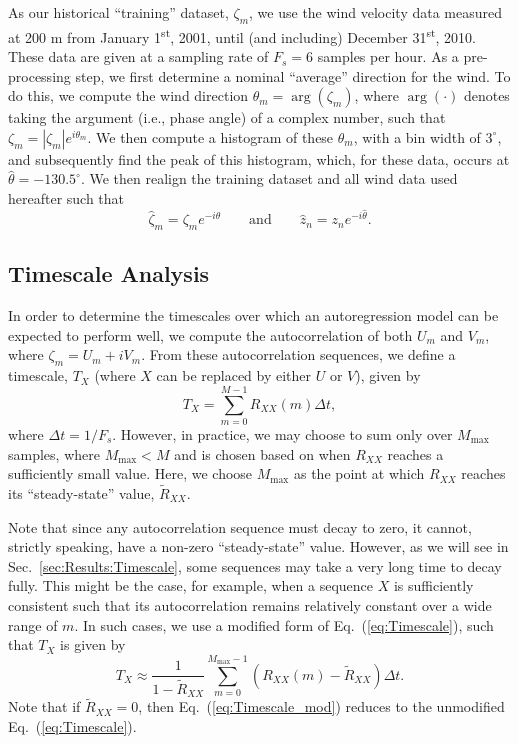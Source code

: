 \documentclass[11pt, oneside]{article}
\newcommand{\eqnref}[1]{Eq.~(\ref{#1})}
\newcommand{\secref}[1]{Sec.~\ref{#1}}
\begin{document}
As our historical ``training'' dataset, $\zeta_m$, we use the wind velocity data measured at 200 m from January 1\textsuperscript{st}, 2001, until (and including) December 31\textsuperscript{st}, 2010.
These data are given at a sampling rate of $F_s = 6$ samples per hour.
As a pre-processing step, we first determine a nominal ``average'' direction for the wind.
To do this, we compute the wind direction $\theta_m = \arg (\zeta_m)$, where $\arg ( \cdot )$ denotes taking the argument (i.e., phase angle) of a complex number, such that $\zeta_m = |\zeta_m| e^{i \theta_m}$.
We then compute a histogram of these $\theta_m$, with a bin width of $3^\circ$, and subsequently find the peak of this histogram, which, for these data, occurs at $\hat{\theta} = -130.5^\circ$.
We then realign the training dataset and all wind data used hereafter such that
\begin{equation}
\hat{\zeta}_m = \zeta_m e^{-i\hat{\theta}}
\quad\quad \text{and} \quad\quad
\hat{z}_n = z_n e^{-i\hat{\theta}}.
\end{equation}

\subsection{Timescale Analysis}\label{sec:Methodology:Timescale}
In order to determine the timescales over which an autoregression model can be expected to perform well, we compute the autocorrelation of both $U_m$ and $V_m$, where $\zeta_m = U_m + i V_m$.
From these autocorrelation sequences, we define a timescale, $T_X$ (where $X$ can be replaced by either $U$ or $V$), given by
\begin{equation}\label{eq:Timescale}
T_X = \sum_{m = 0}^{M-1} R_{XX}(m) \Delta t,
\end{equation}
where $\Delta t = 1/F_s$.
However, in practice, we may choose to sum only over $M_\text{max}$ samples, where $M_\text{max} < M$ and is chosen based on when $R_{XX}$ reaches a sufficiently small value.
Here, we choose $M_\text{max}$ as the point at which $R_{XX}$ reaches its ``steady-state'' value, $\tilde{R}_{XX}$.

Note that since any autocorrelation sequence must decay to zero, it cannot, strictly speaking, have a non-zero ``steady-state'' value.
However, as we will see in \secref{sec:Results:Timescale}, some sequences may take a very long time to decay fully.
This might be the case, for example, when a sequence $X$ is sufficiently consistent such that its autocorrelation remains relatively constant over a wide range of $m$.
In such cases, we use a modified form of \eqnref{eq:Timescale}, such that $T_X$ is given by
\begin{equation}\label{eq:Timescale_mod}
T_X \approx \frac{1}{1 - \tilde{R}_{XX}} \sum_{m = 0}^{M_\text{max}-1} (R_{XX}(m) - \tilde{R}_{XX}) \Delta t.
\end{equation}
Note that if $\tilde{R}_{XX} = 0$, then \eqnref{eq:Timescale_mod} reduces to the unmodified \eqnref{eq:Timescale}.
\end{document}
